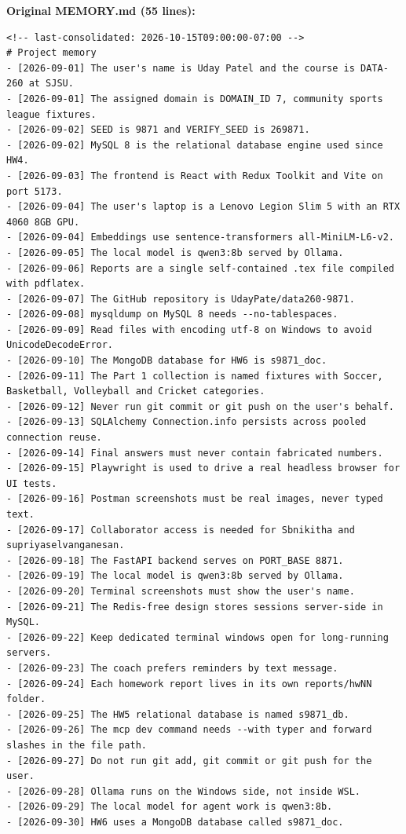 \documentclass[11pt]{article}
\begin{document}
\textbf{Original MEMORY.md (55 lines):}
\begingroup\lstset{basicstyle=\ttfamily\tiny}
\begin{lstlisting}
<!-- last-consolidated: 2026-10-15T09:00:00-07:00 -->
# Project memory
- [2026-09-01] The user's name is Uday Patel and the course is DATA-260 at SJSU.
- [2026-09-01] The assigned domain is DOMAIN_ID 7, community sports league fixtures.
- [2026-09-02] SEED is 9871 and VERIFY_SEED is 269871.
- [2026-09-02] MySQL 8 is the relational database engine used since HW4.
- [2026-09-03] The frontend is React with Redux Toolkit and Vite on port 5173.
- [2026-09-04] The user's laptop is a Lenovo Legion Slim 5 with an RTX 4060 8GB GPU.
- [2026-09-04] Embeddings use sentence-transformers all-MiniLM-L6-v2.
- [2026-09-05] The local model is qwen3:8b served by Ollama.
- [2026-09-06] Reports are a single self-contained .tex file compiled with pdflatex.
- [2026-09-07] The GitHub repository is UdayPate/data260-9871.
- [2026-09-08] mysqldump on MySQL 8 needs --no-tablespaces.
- [2026-09-09] Read files with encoding utf-8 on Windows to avoid UnicodeDecodeError.
- [2026-09-10] The MongoDB database for HW6 is s9871_doc.
- [2026-09-11] The Part 1 collection is named fixtures with Soccer, Basketball, Volleyball and Cricket categories.
- [2026-09-12] Never run git commit or git push on the user's behalf.
- [2026-09-13] SQLAlchemy Connection.info persists across pooled connection reuse.
- [2026-09-14] Final answers must never contain fabricated numbers.
- [2026-09-15] Playwright is used to drive a real headless browser for UI tests.
- [2026-09-16] Postman screenshots must be real images, never typed text.
- [2026-09-17] Collaborator access is needed for Sbnikitha and supriyaselvanganesan.
- [2026-09-18] The FastAPI backend serves on PORT_BASE 8871.
- [2026-09-19] The local model is qwen3:8b served by Ollama.
- [2026-09-20] Terminal screenshots must show the user's name.
- [2026-09-21] The Redis-free design stores sessions server-side in MySQL.
- [2026-09-22] Keep dedicated terminal windows open for long-running servers.
- [2026-09-23] The coach prefers reminders by text message.
- [2026-09-24] Each homework report lives in its own reports/hwNN folder.
- [2026-09-25] The HW5 relational database is named s9871_db.
- [2026-09-26] The mcp dev command needs --with typer and forward slashes in the file path.
- [2026-09-27] Do not run git add, git commit or git push for the user.
- [2026-09-28] Ollama runs on the Windows side, not inside WSL.
- [2026-09-29] The local model for agent work is qwen3:8b.
- [2026-09-30] HW6 uses a MongoDB database called s9871_doc.

\end{lstlisting}
\end{document}
